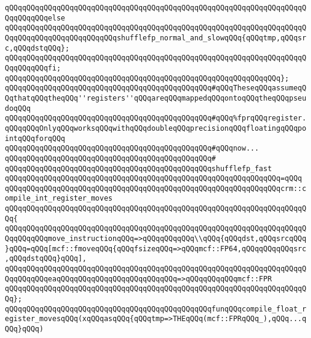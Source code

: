\verb|qQQqqQQqqQQqqQQqqQQqqQQqqQQqqQQqqQQqqQQqqQQqqQQqqQQqqQQqqQQqqQQqqQQqqQQqqQQqqQQqelse|\newline
\verb|qQQqqQQqqQQqqQQqqQQqqQQqqQQqqQQqqQQqqQQqqQQqqQQqqQQqqQQqqQQqqQQqqQQqqQQqqQQqqQQqqQQqqQQqqQQqqQQqshufflefp_normal_and_slowqQQq{qQQqtmp,qQQqsrc,qQQqdstqQQq};|\newline
\verb|qQQqqQQqqQQqqQQqqQQqqQQqqQQqqQQqqQQqqQQqqQQqqQQqqQQqqQQqqQQqqQQqqQQqqQQqqQQqqQQqfi;|\newline
\verb|qQQqqQQqqQQqqQQqqQQqqQQqqQQqqQQqqQQqqQQqqQQqqQQqqQQqqQQqqQQqqQQq};|\newline
\newline
\verb|qQQqqQQqqQQqqQQqqQQqqQQqqQQqqQQqqQQqqQQqqQQqqQQq#qQQqTheseqQQqassumeqQQqthatqQQqtheqQQq''registers''qQQqareqQQqmappedqQQqontoqQQqtheqQQqpseudoqQQq|\newline
\verb|qQQqqQQqqQQqqQQqqQQqqQQqqQQqqQQqqQQqqQQqqQQqqQQq#qQQq%fprqQQqregister.qQQqqQQqOnlyqQQqworksqQQqwithqQQqdoubleqQQqprecisionqQQqfloatingqQQqpointqQQqforqQQq|\newline
\verb|qQQqqQQqqQQqqQQqqQQqqQQqqQQqqQQqqQQqqQQqqQQqqQQq#qQQqnow...|\newline
\verb|qQQqqQQqqQQqqQQqqQQqqQQqqQQqqQQqqQQqqQQqqQQqqQQq#|\newline
\verb|qQQqqQQqqQQqqQQqqQQqqQQqqQQqqQQqqQQqqQQqqQQqqQQqshufflefp_fast|\newline
\verb|qQQqqQQqqQQqqQQqqQQqqQQqqQQqqQQqqQQqqQQqqQQqqQQqqQQqqQQqqQQqqQQq=qQQq|\newline
\verb|qQQqqQQqqQQqqQQqqQQqqQQqqQQqqQQqqQQqqQQqqQQqqQQqqQQqqQQqqQQqqQQqcrm::compile_int_register_moves|\newline
\verb|qQQqqQQqqQQqqQQqqQQqqQQqqQQqqQQqqQQqqQQqqQQqqQQqqQQqqQQqqQQqqQQqqQQqqQQq{|\newline
\verb|qQQqqQQqqQQqqQQqqQQqqQQqqQQqqQQqqQQqqQQqqQQqqQQqqQQqqQQqqQQqqQQqqQQqqQQqqQQqqQQqmove_instructionqQQq=>qQQqqQQqqQQq\\qQQq{qQQqdst,qQQqsrcqQQq}qQQq=qQQq[mcf::fmoveqQQq{qQQqfsizeqQQq=>qQQqmcf::FP64,qQQqqQQqqQQqsrc,qQQqdstqQQq}qQQq],|\newline
\verb|qQQqqQQqqQQqqQQqqQQqqQQqqQQqqQQqqQQqqQQqqQQqqQQqqQQqqQQqqQQqqQQqqQQqqQQqqQQqqQQqeaqQQqqQQqqQQqqQQqqQQqqQQqqQQq=>qQQqqQQqqQQqmcf::FPR|\newline
\verb|qQQqqQQqqQQqqQQqqQQqqQQqqQQqqQQqqQQqqQQqqQQqqQQqqQQqqQQqqQQqqQQqqQQqqQQq};|\newline
\newline
\verb|qQQqqQQqqQQqqQQqqQQqqQQqqQQqqQQqqQQqqQQqqQQqqQQqfunqQQqcompile_float_register_movesqQQq(xqQQqasqQQq{qQQqtmp=>THEqQQq(mcf::FPRqQQq_),qQQq...qQQq}qQQq)|\newline
